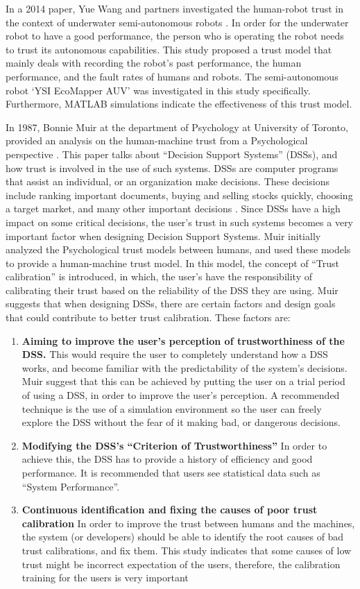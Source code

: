 \documentclass[runningheads,a4paper]{llncs}
\begin{document}
In a 2014 paper, Yue Wang and partners investigated the human-robot trust in the context of underwater semi-autonomous robots \cite{wang2014human}. In order for the underwater robot to have a good performance, the person who is operating the robot needs to trust its autonomous capabilities. This study proposed a trust model that mainly deals with recording the robot's past performance, the human performance, and the fault rates of humans and robots. The semi-autonomous robot `YSI EcoMapper AUV' was investigated in this study specifically. Furthermore, MATLAB simulations indicate the effectiveness of this trust model.

In 1987, Bonnie Muir at the department of Psychology at University of Toronto, provided an analysis on the human-machine trust from a Psychological perspective \cite{muir1987trust}. This paper talks about ``Decision Support Systems'' (DSSs), and how trust is involved in the use of such systems. DSSs are computer programs that assist an individual, or an organization make decisions. These decisions include ranking important documents, buying and selling stocks quickly, choosing a target market, and many other important decisions \cite{decisionSupportTrust}. Since DSSs have a high impact on some critical decisions, the user's trust in such systems becomes a very important factor when designing  Decision Support Systems. Muir initially analyzed the Psychological trust models between humans, and used these models to provide a human-machine trust model. In this model, the concept of ``Trust calibration'' is introduced, in which, the user's have the responsibility of calibrating their trust based on the reliability of the DSS they are using. Muir suggests that when designing DSSs, there are certain factors and design goals that could contribute to better trust calibration. These factors are:
 \begin{enumerate}
 	\item \textbf{Aiming to improve the user's perception of trustworthiness of the DSS.}
 	This would require the user to completely understand how a DSS works, and become familiar with the predictability of the system's decisions. Muir suggest that this can be achieved by putting the user on a trial period of using a DSS, in order to improve the user's perception. A recommended technique is the use of a simulation environment so the user can freely explore the DSS without the fear of it making bad, or dangerous decisions.
 	\item \textbf{Modifying the DSS's ``Criterion of Trustworthiness''}
 In order to achieve this, the DSS has to provide a history of efficiency and good performance. It is recommended that users see statistical data such as ``System Performance''.
 	\item \textbf{Continuous identification and fixing the causes of poor trust calibration}
 In order to improve the trust between humans and the machines, the system (or developers) should be able to identify the root causes of bad trust calibrations, and fix them. This study indicates that some causes of low trust might be incorrect expectation of the users, therefore, the calibration training for the users is very important
 \end{enumerate}
\end{document}
